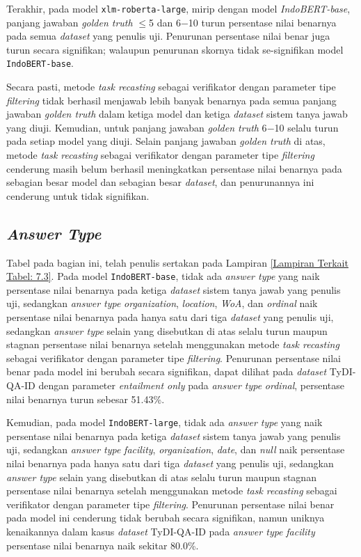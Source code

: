Terakhir, pada model \texttt{xlm-roberta-large}, mirip dengan model \emph{IndoBERT-base}, panjang jawaban \emph{golden truth} $\leq$5 dan 6$-$10 turun persentase nilai benarnya pada semua \emph{dataset} yang penulis uji. Penurunan persentase nilai benar juga turun secara signifikan; walaupun penurunan skornya tidak se-signifikan model \texttt{IndoBERT-base}.

Secara pasti, metode \emph{task recasting} sebagai verifikator dengan parameter tipe \emph{filtering} tidak berhasil menjawab lebih banyak benarnya pada semua panjang jawaban \emph{golden truth} dalam ketiga model dan ketiga \emph{dataset} sistem tanya jawab yang diuji. Kemudian, untuk panjang jawaban \emph{golden truth} 6$-$10 selalu turun pada setiap model yang diuji. Selain panjang jawaban \emph{golden truth} di atas, metode \emph{task recasting} sebagai verifikator dengan parameter tipe \emph{filtering} cenderung masih belum berhasil meningkatkan persentase nilai benarnya pada sebagian besar model dan sebagian besar \emph{dataset}, dan penurunannya ini cenderung untuk tidak signifikan.

\subsection{\emph{Answer Type}}
Tabel pada bagian ini, telah penulis sertakan pada Lampiran \ref{Lampiran Terkait Tabel: 7.3}. Pada model \texttt{IndoBERT-base}, tidak ada \emph{answer type} yang naik persentase nilai benarnya pada ketiga \emph{dataset} sistem tanya jawab yang penulis uji, sedangkan \emph{answer type} \emph{organization}, \emph{location}, \emph{WoA}, dan \emph{ordinal} naik persentase nilai benarnya pada hanya satu dari tiga \emph{dataset} yang penulis uji, sedangkan \emph{answer type} selain yang disebutkan di atas selalu turun maupun stagnan persentase nilai benarnya setelah menggunakan metode \emph{task recasting} sebagai verifikator dengan parameter tipe \emph{filtering}. Penurunan persentase nilai benar pada model ini berubah secara signifikan, dapat dilihat pada \emph{dataset} TyDI-QA-ID dengan parameter \emph{entailment only} pada \emph{answer type} \emph{ordinal}, persentase nilai benarnya turun sebesar 51.43\%.

Kemudian, pada model \texttt{IndoBERT-large}, tidak ada \emph{answer type} yang naik persentase nilai benarnya pada ketiga \emph{dataset} sistem tanya jawab yang penulis uji, sedangkan \emph{answer type} \emph{facility}, \emph{organization}, \emph{date}, dan \emph{null} naik persentase nilai benarnya pada hanya satu dari tiga \emph{dataset} yang penulis uji, sedangkan \emph{answer type} selain yang disebutkan di atas selalu turun maupun stagnan persentase nilai benarnya setelah menggunakan metode \emph{task recasting} sebagai verifikator dengan parameter tipe \emph{filtering}. Penurunan persentase nilai benar pada model ini cenderung tidak berubah secara signifikan, namun uniknya kenaikannya dalam kasus \emph{dataset} TyDI-QA-ID pada \emph{answer type} \emph{facility} persentase nilai benarnya naik sekitar 80.0\%.

